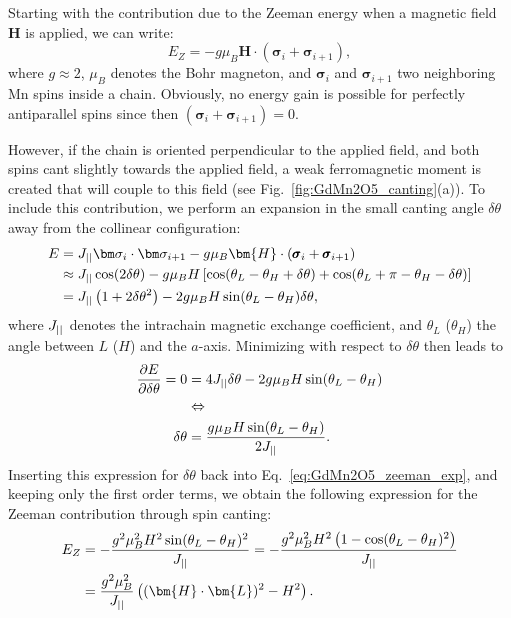 Starting with the contribution due to the Zeeman energy when a magnetic field $\bm H$ is applied, we can write:
\begin{equation}
	E_Z = -g \mu_B \bm{H} \cdot (\pmb{\sigma}_i + \pmb{\sigma}_{i+1}),
\end{equation}
where $g \approx 2$, $\mu_B$ denotes the Bohr magneton, and $\bm \sigma_i$ and $\bm \sigma_{i+1}$ two neighboring Mn spins inside a chain. 
Obviously, no energy gain is possible for perfectly antiparallel spins since then $(\pmb{\sigma}_i + \pmb{\sigma}_{i+1})=0$.

However, if the chain is oriented perpendicular to the applied field, and both spins cant slightly towards the applied field, a weak ferromagnetic moment is created that will couple to this field (see Fig.~\ref{fig:GdMn2O5_canting}(a)).
To include this contribution, we perform an expansion in the small canting angle $\delta \theta$ away from the collinear configuration:
\begin{align}
	E &= \Jpar \bm \sigma_i \cdot \bm \sigma_{i+1} -g \mu_B \bm{H} \cdot (\pmb{\sigma}_i + \pmb{\sigma}_{i+1})\nonumber\\
	 &\approx \Jpar \cos(2\delta \theta) - g \mu_B H \left[\cos(\theta_L - \theta_H + \delta \theta) + \cos(\theta_L + \pi - \theta_H - \delta \theta)\right]\nonumber\\
	&= \Jpar \left( 1+2\delta\theta^2 \right) - 2 g \mu_B H \sin(\theta_L - \theta_H)\delta\theta \label{eq:GdMn2O5_zeeman_exp},
\end{align}
where $J_{||}$ denotes the intrachain magnetic exchange coefficient, and $\theta_L$ ($\theta_H$) the angle between $L$ ($H$) and the $a$-axis.
Minimizing with respect to $\delta \theta$ then leads to
\begin{align}
	\frac{\partial E}{\partial \delta \theta} = 0 &= 4 J_{||} \delta \theta - 2 g \mu_B H \sin(\theta_L - \theta_H) \\
	&\Leftrightarrow \nonumber\\
	\delta \theta &= \frac{g\mu_B H \sin(\theta_L - \theta_H)}{2 J_{||}}.
\end{align}
Inserting this expression for $\delta \theta$ back into Eq.~\eqref{eq:GdMn2O5_zeeman_exp}, and keeping only the first order terms, we obtain the following expression for the Zeeman contribution through spin canting:
\begin{align}
	E_Z &= -\frac{g^2\mu_B^2 H^2 \sin(\theta_L - \theta_H)^2}{\Jpar} = -\frac{g^2\mu_B^2 H^2 \left(1 - \cos(\theta_L - \theta_H)^2\right)}{\Jpar}\nonumber\\
	&=\frac{g^2\mu_B^2}{\Jpar}\left((\bm{H}\cdot\bm{L})^2 - H^2\right)\label{eq:GdMn2O5_Zeeman}.
\end{align}
